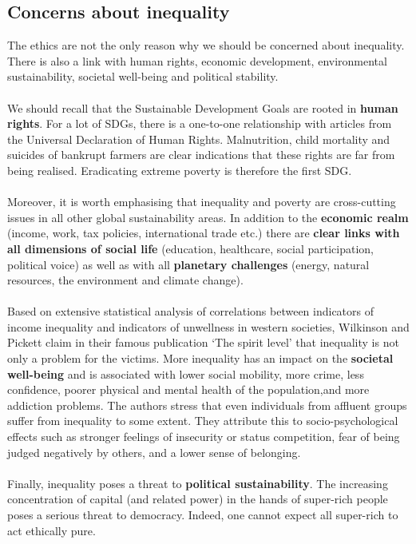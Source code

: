\documentclass[../summary.tex]{subfiles}
\begin{document}
\subsection{Concerns about inequality}
The ethics are not the only reason why we should be concerned about inequality. There is also a link with human rights, economic development, environmental sustainability, societal well-being and political stability.
\\\\
We should recall that the Sustainable Development Goals are rooted in \textbf{human rights}. For a lot of SDGs, there is a one-to-one relationship with articles from the Universal Declaration of Human Rights. Malnutrition, child mortality and suicides of bankrupt farmers are clear indications that these rights are far from being realised. Eradicating extreme poverty is therefore the first SDG.
\\\\
Moreover, it is worth emphasising that inequality and poverty are cross-cutting issues in all other global sustainability areas. In addition to the \textbf{economic realm} (income, work, tax policies, international trade etc.) there are \textbf{clear links with all dimensions of social life} (education, healthcare, social participation, political voice) as well as with all \textbf{planetary challenges} (energy, natural resources, the environment and climate change).
\\\\
Based on extensive statistical analysis of correlations between indicators of income inequality and indicators of unwellness in western societies, Wilkinson and Pickett claim in their famous publication `The spirit level' that inequality is not only a problem for the victims. More inequality has an impact on the \textbf{societal well-being} and is associated with lower social mobility, more crime, less confidence, poorer physical and mental health of the population,and more addiction problems. The authors stress that even individuals from affluent groups suffer from inequality to some extent. They attribute this to socio-psychological effects such as stronger feelings of insecurity or status competition, fear of being judged negatively by others, and a lower sense of belonging.
\\\\
Finally, inequality poses a threat to \textbf{political sustainability}. The increasing concentration of capital (and related power) in the hands of super-rich people poses a serious threat to democracy. Indeed, one cannot expect all super-rich to act ethically pure.
\end{document}
